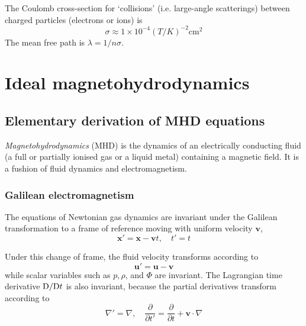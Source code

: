 \documentclass{jknotes}
\begin{document}
The Coulomb cross-section for `collisions' (i.e. large-angle scatterings)
between charged particles (electrons or ions) is
\begin{equation}
	\sigma \approx 1 \times 10^{-4} (T/K)^{-2} \text{cm}^2
\end{equation}
The mean free path is $\lambda = 1/n\sigma$.

\section{Ideal magnetohydrodynamics}

\subsection{Elementary derivation of MHD equations}
\emph{Magnetohydrodynamics} (MHD) is the dynamics of an electrically
conducting fluid (a full or partially ionised gas or a liquid metal)
containing a magnetic field. It is a fushion of fluid dynamics and
electromagnetism.

\subsubsection{Galilean electromagnetism}
The equations of Newtonian gas dynamics are invariant under the Galilean
transformation to a frame of reference moving with uniform velocity
$\symbf{v}$,
\begin{equation}
	\symbf{x}'=\symbf{x}-\symbf{v}t, \hspace{1em} t' = t
\end{equation}

Under this change of frame, the fluid velocity transforms according to
\begin{equation}
	\symbf{u}'=\symbf{u}-\symbf{v}
\end{equation}
while scalar variables such as $p, \rho$, and $\Phi$ are invariant. The
Lagrangian time derivative $\mathrm{D}/\mathrm{D} t$ is also invariant, because the
partial derivatives transform according to
\begin{equation}
	\nabla' = \nabla, \hspace{1em} \frac{\partial}{\partial t'} =
	\frac{\partial}{\partial t} + \symbf{v}\cdot\nabla
\end{equation}
\end{document}
